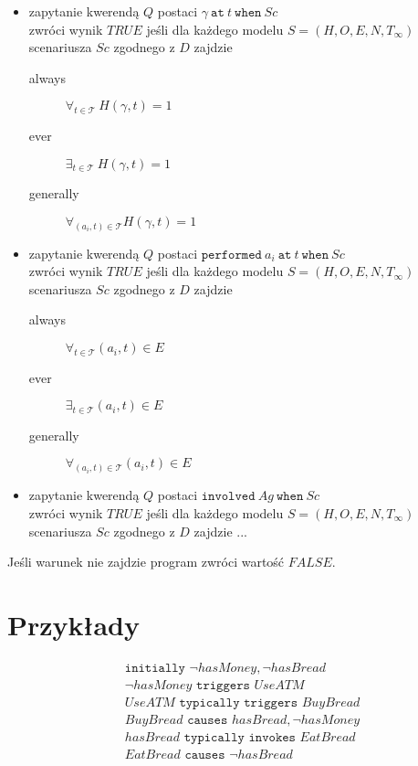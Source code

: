 \begin{itemize}
	\item zapytanie kwerendą $Q$ postaci $\gamma\ \texttt{at}\ t\ \texttt{when}\ Sc$\\ zwróci wynik $TRUE$ jeśli dla każdego modelu $S=(H,O,E,N,T_{\infty})$ scenariusza $Sc$ zgodnego z $D$ zajdzie\\
	\begin{description}
		\item[always] $\forall_{t \in \mathcal{T}}\ H(\gamma,t)=1$ 
		\item[ever] $\exists_{t \in \mathcal{T}}\ H(\gamma,t)=1$
		\item[generally] $\forall_{(a_i,t)\in \mathcal{T}} H(\gamma,t)=1$
	\end{description}
	\item zapytanie kwerendą $Q$ postaci $\texttt{performed}\ a_i\ \texttt{at}\ t\ \texttt{when}\ Sc$\\ zwróci wynik $TRUE$ jeśli dla każdego modelu $S=(H,O,E,N,T_{\infty})$ scenariusza $Sc$ zgodnego z $D$ zajdzie
	\begin{description}
		\item[always] $\forall_{t \in \mathcal{T}} (a_i,t) \in E$
		\item[ever] $\exists_{t \in \mathcal{T}} (a_i,t) \in E$
		\item[generally] $\forall_{(a_i,t)\in \mathcal{T}} (a_i,t) \in E$
	\end{description}
	\item zapytanie kwerendą $Q$ postaci $\texttt{involved}\ Ag\ \texttt{when}\ Sc$\\ zwróci wynik $TRUE$ jeśli dla każdego modelu $S=(H,O,E,N,T_{\infty})$ scenariusza $Sc$ zgodnego z $D$ zajdzie ...
\end{itemize}

\begin{remark}
   Jeśli warunek nie zajdzie program zwróci wartość $FALSE$.
\end{remark}
\section{Przykłady}
\begin{example}
	\begin{align*}
	&\texttt{initially } \neg hasMoney, \neg hasBread \\
	&\neg hasMoney \texttt{ triggers } UseATM \\
	&UseATM \texttt{ typically triggers } BuyBread \\
	&BuyBread \texttt{ causes } hasBread, \neg hasMoney \\
	&hasBread \texttt{ typically invokes } EatBread \\
 	&EatBread \texttt{ causes } \neg hasBread
	\end{align*}
\end{example}

